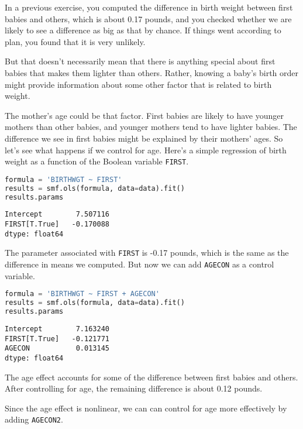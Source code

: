 In a previous exercise, you computed the difference in birth weight
between first babies and others, which is about 0.17 pounds, and you
checked whether we are likely to see a difference as big as that by
chance. If things went according to plan, you found that it is very
unlikely.

But that doesn't necessarily mean that there is anything special about
first babies that makes them lighter than others. Rather, knowing a
baby's birth order might provide information about some other factor
that is related to birth weight.

The mother's age could be that factor. First babies are likely to have
younger mothers than other babies, and younger mothers tend to have
lighter babies. The difference we see in first babies might be explained
by their mothers' ages. So let's see what happens if we control for age.
Here's a simple regression of birth weight as a function of the Boolean
variable \passthrough{\lstinline!FIRST!}.

\begin{lstlisting}[language=Python,style=source]
formula = 'BIRTHWGT ~ FIRST'
results = smf.ols(formula, data=data).fit()
results.params
\end{lstlisting}

\begin{lstlisting}[style=output]
Intercept        7.507116
FIRST[T.True]   -0.170088
dtype: float64
\end{lstlisting}

The parameter associated with \passthrough{\lstinline!FIRST!} is -0.17
pounds, which is the same as the difference in means we computed. But
now we can add \passthrough{\lstinline!AGECON!} as a control variable.

\begin{lstlisting}[language=Python,style=source]
formula = 'BIRTHWGT ~ FIRST + AGECON'
results = smf.ols(formula, data=data).fit()
results.params
\end{lstlisting}

\begin{lstlisting}[style=output]
Intercept        7.163240
FIRST[T.True]   -0.121771
AGECON           0.013145
dtype: float64
\end{lstlisting}

The age effect accounts for some of the difference between first babies
and others. After controlling for age, the remaining difference is about
0.12 pounds.

Since the age effect is nonlinear, we can can control for age more
effectively by adding \passthrough{\lstinline!AGECON2!}.

